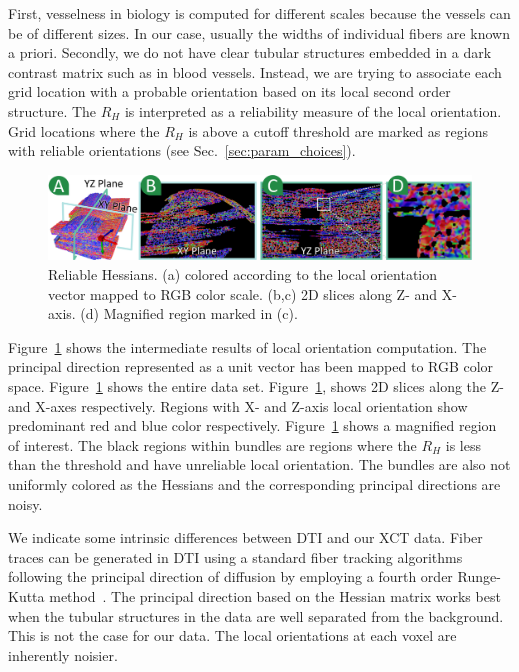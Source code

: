 First, vesselness in biology is computed for different scales because the vessels can be of different sizes. In our case, usually the widths of individual fibers are known a priori.
Secondly, we do not have clear tubular structures embedded in a dark contrast matrix such as in blood vessels.
Instead, we are trying to associate each grid location  with a probable orientation based on its local second order structure. The $R_{H}$ is interpreted as a reliability measure of the local orientation.
Grid locations where the $R_{H}$ is above a cutoff threshold are marked as regions with reliable orientations (see Sec.~\ref{sec:param_choices}).

\begin{figure}[tb]
\centering
\includegraphics[width=\linewidth]{images/reliable_hessian.eps}
 \vspace{-1.5em}
\caption{Reliable Hessians. (a) \mt colored according to the local orientation vector mapped to RGB color scale. (b,c) 2D slices along Z- and X- axis. (d) Magnified region marked in (c).}
\label{fig:reliable_hessian}
\vskip-0.2cm
\end{figure}
Figure~\ref{fig:reliable_hessian} shows the intermediate results of local orientation computation.
The principal direction represented as a unit vector has been mapped to RGB color space.
Figure~\ref{fig:reliable_hessian} shows the entire data set. 
Figure~\ref{fig:reliable_hessian}, shows 2D slices along the Z- and X-axes respectively. Regions with X- and Z-axis local orientation show predominant red and blue color respectively.   Figure~\ref{fig:reliable_hessian} shows a magnified region of interest. The black regions within bundles are regions where the $R_H$ is less than the threshold and have unreliable local orientation. The bundles are also not uniformly colored as the Hessians and the corresponding principal directions are noisy.

We indicate some intrinsic differences between DTI and our XCT data. Fiber traces can be generated in DTI using a standard fiber tracking algorithms following the principal direction of diffusion by employing a fourth order Runge-Kutta method~\cite{Brun2003}. The principal direction based on the Hessian matrix works best when the tubular structures in the data are well separated from the background. This is not the case for our data. The local orientations at each voxel are inherently noisier.
